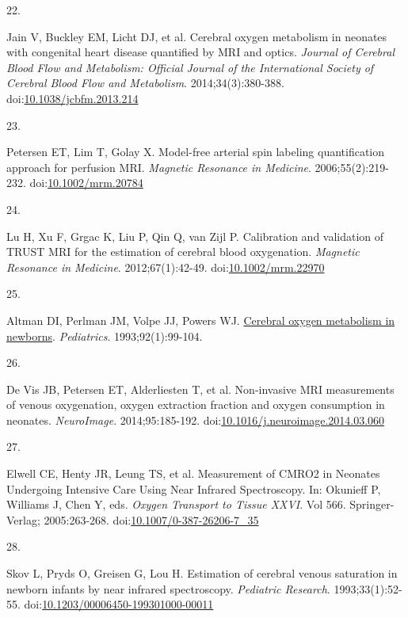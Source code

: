 \documentclass[
  letterpaper,
  DIV=11,
  numbers=noendperiod]{scrartcl}
\newlength{\cslhangindent}
\newlength{\csllabelwidth}
\newenvironment{CSLReferences}[2] %
 {\begin{list}{}{%
  \setlength{\itemindent}{0pt}
  \setlength{\leftmargin}{0pt}
  \setlength{\parsep}{0pt}
  \ifodd #1
   \setlength{\leftmargin}{\cslhangindent}
   \setlength{\itemindent}{-1\cslhangindent}
  \fi
  \setlength{\itemsep}{#2\baselineskip}}}
 {\end{list}}
\newcommand{\CSLLeftMargin}[1]{\parbox[t]{\csllabelwidth}{\strut#1\strut}}
\newcommand{\CSLRightInline}[1]{\parbox[t]{\linewidth - \csllabelwidth}{\strut#1\strut}}
\begin{document}
\begin{CSLReferences}{0}{1}
\CSLLeftMargin{22. }%
\CSLRightInline{Jain V, Buckley EM, Licht DJ, et al. Cerebral oxygen
metabolism in neonates with congenital heart disease quantified by {MRI}
and optics. \emph{Journal of Cerebral Blood Flow and Metabolism:
Official Journal of the International Society of Cerebral Blood Flow and
Metabolism}. 2014;34(3):380-388.
doi:\href{https://doi.org/10.1038/jcbfm.2013.214}{10.1038/jcbfm.2013.214}}

\CSLLeftMargin{23. }%
\CSLRightInline{Petersen ET, Lim T, Golay X. Model-free arterial spin
labeling quantification approach for perfusion {MRI}. \emph{Magnetic
Resonance in Medicine}. 2006;55(2):219-232.
doi:\href{https://doi.org/10.1002/mrm.20784}{10.1002/mrm.20784}}

\CSLLeftMargin{24. }%
\CSLRightInline{Lu H, Xu F, Grgac K, Liu P, Qin Q, van Zijl P.
Calibration and validation of {TRUST MRI} for the estimation of cerebral
blood oxygenation. \emph{Magnetic Resonance in Medicine}.
2012;67(1):42-49.
doi:\href{https://doi.org/10.1002/mrm.22970}{10.1002/mrm.22970}}

\CSLLeftMargin{25. }%
\CSLRightInline{Altman DI, Perlman JM, Volpe JJ, Powers WJ.
\href{https://www.ncbi.nlm.nih.gov/pubmed/8516092}{Cerebral oxygen
metabolism in newborns}. \emph{Pediatrics}. 1993;92(1):99-104.}

\CSLLeftMargin{26. }%
\CSLRightInline{De Vis JB, Petersen ET, Alderliesten T, et al.
Non-invasive {MRI} measurements of venous oxygenation, oxygen extraction
fraction and oxygen consumption in neonates. \emph{NeuroImage}.
2014;95:185-192.
doi:\href{https://doi.org/10.1016/j.neuroimage.2014.03.060}{10.1016/j.neuroimage.2014.03.060}}

\CSLLeftMargin{27. }%
\CSLRightInline{Elwell CE, Henty JR, Leung TS, et al. Measurement of
{CMRO2} in {Neonates Undergoing Intensive Care Using Near Infrared
Spectroscopy}. In: Okunieff P, Williams J, Chen Y, eds. \emph{Oxygen
{Transport} to {Tissue XXVI}}. Vol 566. Springer-Verlag; 2005:263-268.
doi:\href{https://doi.org/10.1007/0-387-26206-7_35}{10.1007/0-387-26206-7\_35}}

\CSLLeftMargin{28. }%
\CSLRightInline{Skov L, Pryds O, Greisen G, Lou H. Estimation of
cerebral venous saturation in newborn infants by near infrared
spectroscopy. \emph{Pediatric Research}. 1993;33(1):52-55.
doi:\href{https://doi.org/10.1203/00006450-199301000-00011}{10.1203/00006450-199301000-00011}}


\end{CSLReferences}
\end{document}
